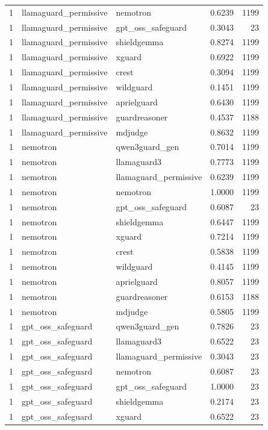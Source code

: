 \begin{tabular}{rllrr}
1 & llamaguard\_permissive & nemotron & 0.6239 & 1199 \\
1 & llamaguard\_permissive & gpt\_oss\_safeguard & 0.3043 & 23 \\
1 & llamaguard\_permissive & shieldgemma & 0.8274 & 1199 \\
1 & llamaguard\_permissive & xguard & 0.6922 & 1199 \\
1 & llamaguard\_permissive & crest & 0.3094 & 1199 \\
1 & llamaguard\_permissive & wildguard & 0.1451 & 1199 \\
1 & llamaguard\_permissive & aprielguard & 0.6430 & 1199 \\
1 & llamaguard\_permissive & guardreasoner & 0.4537 & 1188 \\
1 & llamaguard\_permissive & mdjudge & 0.8632 & 1199 \\
1 & nemotron & qwen3guard\_gen & 0.7014 & 1199 \\
1 & nemotron & llamaguard3 & 0.7773 & 1199 \\
1 & nemotron & llamaguard\_permissive & 0.6239 & 1199 \\
1 & nemotron & nemotron & 1.0000 & 1199 \\
1 & nemotron & gpt\_oss\_safeguard & 0.6087 & 23 \\
1 & nemotron & shieldgemma & 0.6447 & 1199 \\
1 & nemotron & xguard & 0.7214 & 1199 \\
1 & nemotron & crest & 0.5838 & 1199 \\
1 & nemotron & wildguard & 0.4145 & 1199 \\
1 & nemotron & aprielguard & 0.8057 & 1199 \\
1 & nemotron & guardreasoner & 0.6153 & 1188 \\
1 & nemotron & mdjudge & 0.5805 & 1199 \\
1 & gpt\_oss\_safeguard & qwen3guard\_gen & 0.7826 & 23 \\
1 & gpt\_oss\_safeguard & llamaguard3 & 0.6522 & 23 \\
1 & gpt\_oss\_safeguard & llamaguard\_permissive & 0.3043 & 23 \\
1 & gpt\_oss\_safeguard & nemotron & 0.6087 & 23 \\
1 & gpt\_oss\_safeguard & gpt\_oss\_safeguard & 1.0000 & 23 \\
1 & gpt\_oss\_safeguard & shieldgemma & 0.2174 & 23 \\
1 & gpt\_oss\_safeguard & xguard & 0.6522 & 23 \\

\end{tabular}
